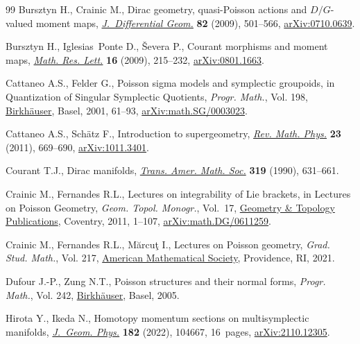 \documentclass[pdftex]{sigma}
\numberwithin{equation}{section}
\begin{document}
\begin{thebibliography}{99}
Bursztyn H., Crainic M., Dirac geometry, quasi-{P}oisson actions and
 {$D/G$}-valued moment maps, \href{https://doi.org/10.4310/jdg/1251122545}{\textit{J.~Differential Geom.}} \textbf{82}
 (2009), 501--566, \href{https://arxiv.org/abs/0710.0639}{arXiv:0710.0639}.

Bursztyn H., Iglesias~Ponte D., \v{S}evera P., Courant morphisms and moment
 maps, \href{https://doi.org/10.4310/MRL.2009.v16.n2.a2}{\textit{Math. Res. Lett.}} \textbf{16} (2009), 215--232,
 \href{https://arxiv.org/abs/0801.1663}{arXiv:0801.1663}.

Cattaneo A.S., Felder G., Poisson sigma models and symplectic groupoids, in
 Quantization of {S}ingular {S}ymplectic {Q}uotients, \textit{Progr. Math.},
 Vol. 198, \href{https://doi.org/10.1007/978-3-0348-8364-1_4}{Birkh\"auser}, Basel, 2001, 61--93, \href{https://arxiv.org/abs/math.SG/0003023}{arXiv:math.SG/0003023}.

Cattaneo A.S., Sch\"atz F., Introduction to supergeometry, \href{https://doi.org/10.1142/S0129055X11004400}{\textit{Rev. Math.
 Phys.}} \textbf{23} (2011), 669--690, \href{https://arxiv.org/abs/1011.3401}{arXiv:1011.3401}.

Courant T.J., Dirac manifolds, \href{https://doi.org/10.2307/2001258}{\textit{Trans. Amer. Math. Soc.}} \textbf{319}
 (1990), 631--661.

Crainic M., Fernandes R.L., Lectures on integrability of {L}ie brackets, in
 Lectures on {P}oisson {G}eometry, \textit{Geom. Topol. Monogr.}, Vol.~17,
 \href{https://doi.org/10.2140/gt}{Geometry \& Topology Publications}, Coventry, 2011, 1--107,
 \href{https://arxiv.org/abs/math.DG/0611259}{arXiv:math.DG/0611259}.

Crainic M., Fernandes R.L., M\u{a}rcu\c{t} I., Lectures on {P}oisson geometry,
 \textit{Grad. Stud. Math.}, Vol. 217, \href{https://doi.org/10.1090/gsm/217}{American Mathematical Society},
 Providence, RI, 2021.

Dufour J.-P., Zung N.T., Poisson structures and their normal forms,
 \textit{Progr. Math.}, Vol. 242, \href{https://doi.org/10.1007/3-7643-7335-0}{Birkh\"auser}, Basel, 2005.

Hirota Y., Ikeda N., Homotopy momentum sections on multisymplectic manifolds,
 \href{https://doi.org/10.1016/j.geomphys.2022.104667}{\textit{J.~Geom. Phys.}} \textbf{182} (2022), 104667, 16~pages,
 \href{https://arxiv.org/abs/2110.12305}{arXiv:2110.12305}.


\end{thebibliography}
\end{document}
